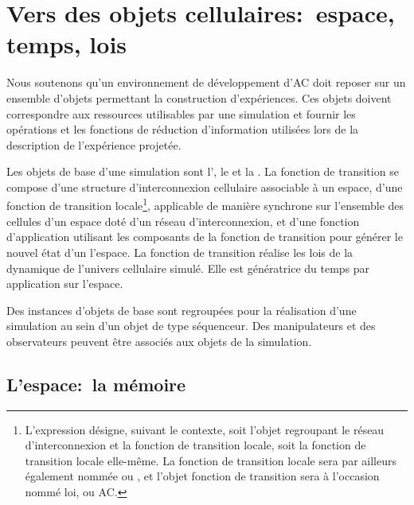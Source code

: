 %
%
\chapter[Espace, temps, lois]{Vers des objets cellulaires:~espace, temps, lois}

Nous soutenons qu'un environnement de développement d'AC doit reposer
sur un ensemble d'objets permettant la construction d'expériences. %
Ces objets doivent correspondre aux ressources utilisables par une
simulation et fournir les opérations et les fonctions de réduction
d'information utilisées lors de la description de l'expérience
projetée. %

Les objets de base d'une simulation sont l', %
le  et la . %
La fonction de transition se compose d'une structure d'interconnexion
cellulaire associable à un espace, d'une fonction de transition
locale\footnote{%
  L'expression  désigne, suivant le
  contexte, soit l'objet regroupant le réseau d'interconnexion et la
  fonction de transition locale, soit la fonction de transition locale
  elle-même. %
  La fonction de transition locale sera par ailleurs également nommée
   ou , et l'objet fonction
  de transition sera à l'occasion nommé loi, ou AC.}, %
applicable de manière synchrone sur l'ensemble des cellules d'un
espace doté d'un réseau d'interconnexion, et d'une fonction
d'application utilisant les composants de la
fonction de transition pour générer le nouvel état d'un l'espace. %
La fonction de transition réalise les lois de la dynamique de
l'univers cellulaire simulé. %
Elle est génératrice du temps par application sur l'espace. %

Des instances d'objets de base sont regroupées pour la réalisation
d'une simulation au sein d'un objet de type séquenceur. %
Des manipulateurs et des observateurs peuvent être associés aux objets
de la simulation. %

\section{L'espace:~la mémoire}

